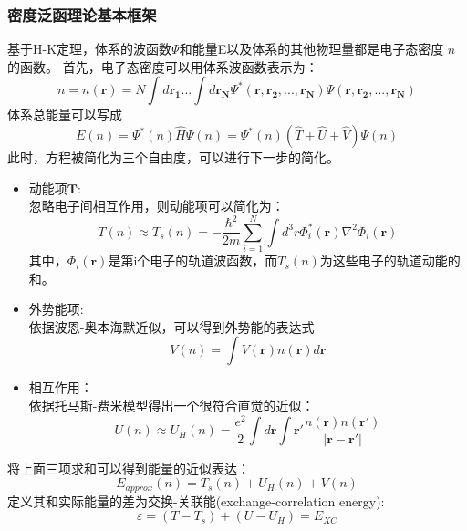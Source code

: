 \subsubsection*{密度泛函理论基本框架}
基于H-K定理，体系的波函数$\Psi$和能量E以及体系的其他物理量都是电子态密度 $n$ 的函数。
首先，电子态密度可以用体系波函数表示为：
\begin{equation}
n = n(\mathbf{r}) = N \int d\mathbf{r_1} ... \int d \mathbf{r_N} \Psi^*(\mathbf{r},\mathbf{r_2},...,\mathbf{r_N})\Psi(\mathbf{r},\mathbf{r_2},...,\mathbf{r_N})
\end{equation}
体系总能量可以写成
\begin{equation}
E(n) = \Psi^*(n) \widehat{H} \Psi(n) = \Psi^*(n) \left(\widehat{T} + \widehat{U} + \widehat{V} \right) \Psi(n)
\end{equation}
此时，方程被简化为三个自由度，可以进行下一步的简化。
\begin{itemize}
	\item 动能项$\mathbf{T}$:\\
	忽略电子间相互作用，则动能项可以简化为：
	\begin{equation}
	T(n) \approx T_s(n) = -\frac{\hbar^2}{2m} \sum^{N}_{i=1} \int d^3r \Phi^*_i(\mathbf{r}) \nabla^2 \Phi_i(\mathbf{r})
	\end{equation}
	其中，$\Phi_i(\mathbf{r})$是第i个电子的轨道波函数，而$T_s(n)$为这些电子的轨道动能的和。
	\item 外势能项:\\
	依据波恩-奥本海默近似，可以得到外势能的表达式
	\begin{equation}
	V(n) = \int V(\mathbf{r}) n(\mathbf{r})d\mathbf{r}
	\end{equation}
	\item 相互作用：\\
	依据托马斯-费米模型得出一个很符合直觉的近似：
	\begin{equation}
	U(n) \approx U_{H}(n) = \frac{e^2}{2} \int d \mathbf{r} \int \mathbf{r'} \frac{n(\mathbf{r})n(\mathbf{r'})}{|\mathbf{r}-\mathbf{r'}|}
	\end{equation}
\end{itemize}
将上面三项求和可以得到能量的近似表达：
\begin{equation}
E_{approx}(n) = T_s(n) + U_H(n) + V(n)
\end{equation}
定义其和实际能量的差为交换-关联能(exchange-correlation energy):
\begin{equation}
\label{eq:e}
\varepsilon = (T - T_s)+(U - U_H) = E_{XC}
\end{equation}
